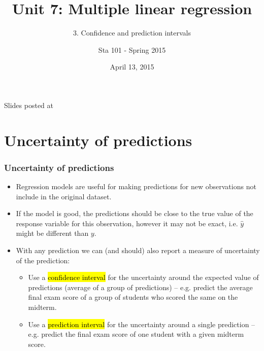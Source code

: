 \documentclass[11pt,containsverbatim,handout,xcolor=xelatex,dvipsnames,table]{beamer}
\title{Unit 7: Multiple linear regression}
\subtitle{3. Confidence and prediction intervals}
\author{Sta 101 - Spring 2015}
\date{April 13, 2015}
\institute{Duke University, Department of Statistical Science}
\begin{document}


\begin{frame}[plain]

\titlepage
\vfill
{\scriptsize {} \hfill Slides posted at  \webLink{\CourseSite}{\CourseSite}}
\addtocounter{framenumber}{-1} 

\end{frame}


%
%
%
%
%
%
%

\section{Uncertainty of predictions}


\begin{frame}
\frametitle{Uncertainty of predictions}

\begin{itemize}

\item Regression models are useful for making predictions for new observations not include in the original dataset.

\pause

\item If the model is good, the predictions should be close to the true value of the response variable for this observation, however it may not be exact, i.e. $\hat{y}$ might be different than $y$.

\pause

\item With any prediction we can (and should) also report a measure of uncertainty of the prediction:
\begin{itemize}
\item Use a \hl{confidence interval} for the uncertainty around the expected value of predictions (average of a group of predictions) -- e.g. predict the average final exam score of a group of students who scored the same on the midterm.
\item Use a \hl{prediction interval} for the uncertainty around a single prediction -- e.g. predict the final exam score of one student with a given midterm score.
\end{itemize}

\end{itemize}

\end{frame}
\end{document}
